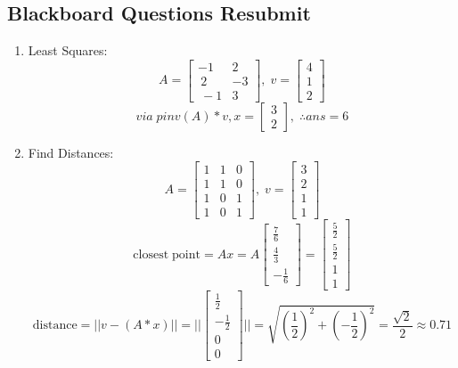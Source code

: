 \documentclass[11pt]{article}
\begin{document}
\begin{preview}
      \section*{Blackboard Questions Resubmit}
      \begin{enumerate}
            \item Least Squares:
            $$A=\begin{bmatrix}-1&2\\ \:2&-3\\ \:-1&3\end{bmatrix}, \; v = \begin{bmatrix}4\\1\\2\end{bmatrix}$$
            $$via \; pinv(A)*v, x = \begin{bmatrix}3\\2 \end{bmatrix}, \; \therefore ans=6$$
            \item Find Distances:
            $$A = \begin{bmatrix}1&1&0\\ 1&1&0\\ 1&0&1\\ 1&0&1 \end{bmatrix}, \; v = \begin{bmatrix}3\\2\\1\\1\end{bmatrix}$$
            $$\mathrm{closest \; point} = Ax = A\begin{bmatrix}\frac{7}{6}\\\frac{4}{3}\\-\frac{1}{6}\end{bmatrix} = \begin{bmatrix}
                  \frac{5}{2}\\\frac{5}{2}\\1\\1
            \end{bmatrix}$$
            $$\mathrm{distance}=||v-(A*x)|| = \Big|\Big|\begin{bmatrix}
                  \frac{1}{2}\\-\frac{1}{2}\\0\\0
            \end{bmatrix}\Big|\Big| = \sqrt{\left(\frac{1}{2}\right)^2+\left(-\frac{1}{2}\right)^2} = \frac{\sqrt{2}}{2} \approx 0.71$$

\end{enumerate}
\end{preview}
\end{document}
